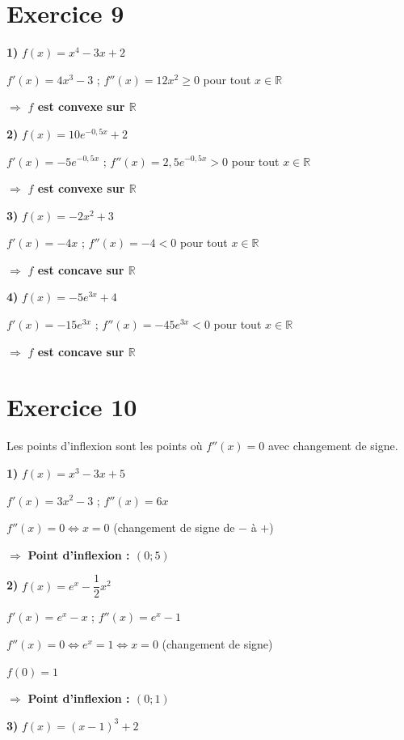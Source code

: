 \documentclass[11pt,a4paper]{article}  %
\begin{document}
\section*{Exercice 9}

\textbf{1)} $f(x) = x^4 - 3x + 2$

$f'(x) = 4x^3 - 3$ \quad ; \quad $f''(x) = 12x^2 \geq 0$ pour tout $x \in \mathbb{R}$

$\Rightarrow$ \textbf{$f$ est convexe sur $\mathbb{R}$}

\textbf{2)} $f(x) = 10e^{-0,5x} + 2$

$f'(x) = -5e^{-0,5x}$ \quad ; \quad $f''(x) = 2,5e^{-0,5x} > 0$ pour tout $x \in \mathbb{R}$

$\Rightarrow$ \textbf{$f$ est convexe sur $\mathbb{R}$}

\textbf{3)} $f(x) = -2x^2 + 3$

$f'(x) = -4x$ \quad ; \quad $f''(x) = -4 < 0$ pour tout $x \in \mathbb{R}$

$\Rightarrow$ \textbf{$f$ est concave sur $\mathbb{R}$}

\textbf{4)} $f(x) = -5e^{3x} + 4$

$f'(x) = -15e^{3x}$ \quad ; \quad $f''(x) = -45e^{3x} < 0$ pour tout $x \in \mathbb{R}$

$\Rightarrow$ \textbf{$f$ est concave sur $\mathbb{R}$}

\section*{Exercice 10}

Les points d'inflexion sont les points où $f''(x) = 0$ avec changement de signe.

\textbf{1)} $f(x) = x^3 - 3x + 5$

$f'(x) = 3x^2 - 3$ \quad ; \quad $f''(x) = 6x$

$f''(x) = 0 \Leftrightarrow x = 0$ (changement de signe de $-$ à $+$)

$\Rightarrow$ \textbf{Point d'inflexion : $(0; 5)$}

\textbf{2)} $f(x) = e^x - \dfrac{1}{2}x^2$

$f'(x) = e^x - x$ \quad ; \quad $f''(x) = e^x - 1$

$f''(x) = 0 \Leftrightarrow e^x = 1 \Leftrightarrow x = 0$ (changement de signe)

$f(0) = 1$

$\Rightarrow$ \textbf{Point d'inflexion : $(0; 1)$}

\textbf{3)} $f(x) = (x-1)^3 + 2$
\end{document}
